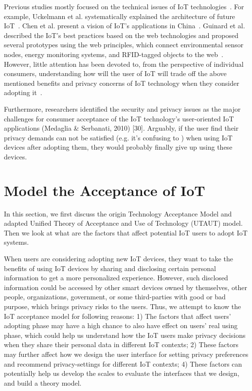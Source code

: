 Previous studies mostly focused on the technical issues of IoT technologies~\cite{fantana2013iot, lazarescu2013design, shang2012internet}. For example, Uckelmann et al. systematically explained the architecture of future IoT~\cite{uckelmann2011architectural}. Chen et al. present a vision of IoT's applications in China~\cite{chen2014vision}. Guinard et al. described the IoT’s best practices based on the web technologies and proposed several prototypes using the web principles, which connect environmental sensor nodes, energy monitoring systems, and RFID-tagged objects to the web~\cite{guinard2011internet}. However, little attention has been devoted to, from the perspective of individual consumers, understanding how will the user of IoT will trade off the above mentioned benefits and privacy concerns of IoT technology when they consider adopting it~\cite{al2016modeling, gao2014unified, mital2018adoption}.

Furthermore, researchers identified the security and privacy issues as the major challenges for consumer acceptance of the IoT technology’s user-oriented IoT applications (Medaglia \& Serbanati, 2010) [30]. Arguably, if the user find their privacy demands can not be satisfied (e.g. it's confusing to ) when using IoT devices after adopting them, they would probably finally give up using these devices.

\section{Model the Acceptance of IoT}
In this section, we first discuss the origin Technology Acceptance Model and adapted Unified Theory of Acceptance and Use of Technology (UTAUT) model. Then we look at what are the factors that affect potential IoT users to adopt IoT systems. 

When users are considering adopting new IoT devices, they want to take the benefits of using IoT devices by sharing and disclosing certain personal information to get a more personalized experience. However, such disclosed information could be accessed by other smart devices owned by themselves, other people, organizations, government, or some third-parties with good or bad purpose, which brings privacy risks to the users. Thus, we attempt to know the IoT acceptance model for following reasons: 1) The factors that affect users' adopting phase may have a high chance to also have effect on users' real using phase, which could help us understand how the IoT users make privacy decisions when they share their personal data in different IoT contexts; 2) These factors may further affect how we design the user interface for setting privacy preferences and recommend privacy-settings for different IoT contexts; 4) These factors can potentially help us develop the scales to evaluate the interfaces that we design, and build a theory model.

